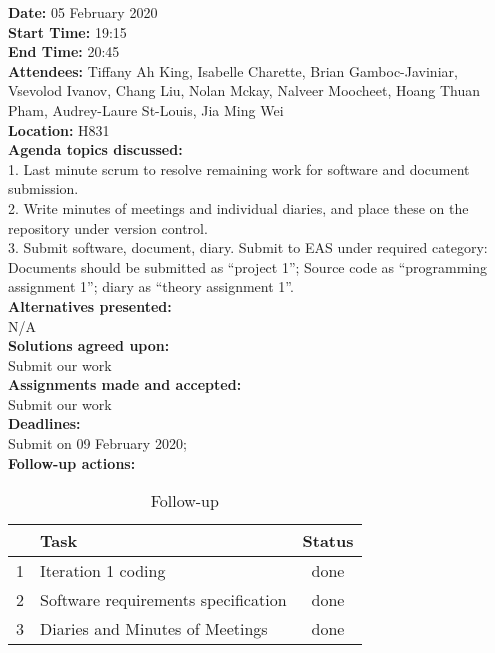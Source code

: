 \documentclass[12pt]{article}
\begin{document}
\newpage
{\bf Date:} 05 February 2020\\
{\bf Start Time:} 19:15\\
{\bf End Time:}  20:45\\
{\bf Attendees:} Tiffany Ah King,
Isabelle Charette,
Brian Gamboc-Javiniar,
Vsevolod Ivanov,
Chang Liu,
Nolan Mckay,
Nalveer Moocheet,
Hoang Thuan Pham,
Audrey-Laure St-Louis,
Jia Ming Wei\\
{\bf Location:} H831 \\
{\bf Agenda topics discussed:} \\1. Last minute scrum to resolve remaining work for software and document submission. 
\\2. Write minutes of meetings and individual diaries, and place these on the repository under version control. 
\\3. Submit software, document, diary. Submit to EAS under required category: Documents should be submitted as “project 1”; Source code as “programming assignment 1”; diary as “theory assignment 1”.\\
{\bf Alternatives presented:} \\N/A \\
{\bf Solutions agreed upon:} \\ Submit our work\\
{\bf Assignments made and accepted:} \\Submit our work \\
{\bf Deadlines:} \\Submit on 09 February 2020; \\
{\bf Follow-up actions:} \\
\begin{table}[h!]
\centering
 \begin{tabular}{||l l c ||} 
 \hline
   & Task & Status\\ [0.5ex] 
 \hline\hline
 1 & Iteration 1 coding & done \\ 
 2 & Software requirements specification &  done\\
 3 & Diaries and Minutes of Meetings &  done\\[1ex] 

 \hline
 \end{tabular}
\caption{Follow-up }
\label{table:1}
\end{table}


\end{document}
